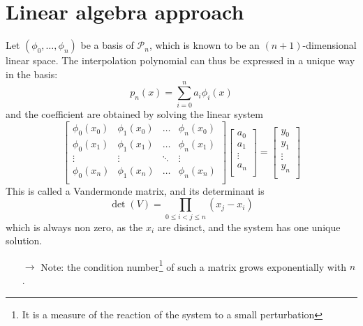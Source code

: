 \documentclass[12pt, openany]{report}
\theoremstyle{definition}
\begin{document}
\section{Linear algebra approach}
Let \((\phi_0,\dots,\phi_n)\) be a basis of \(\mathcal{P}_n\), which is known to be an \((n+1)\)-dimensional linear space. The interpolation polynomial can thus be expressed in a unique way in the basis:
\begin{equation}
    p_n(x) = \sum_{i=0}^n a_i\phi_i(x)
\end{equation}
and the coefficient are obtained by solving the linear system
\begin{equation}
    \begin{bmatrix}
        \phi_0(x_0) & \phi_1(x_0) & \dots & \phi_n(x_0)\\
        \phi_0(x_1) & \phi_1(x_1) & \dots & \phi_n(x_1)\\
        \vdots  & \vdots & \ddots & \vdots\\
        \phi_0(x_n) & \phi_1(x_n) & \dots & \phi_n(x_n)\\
    \end{bmatrix}\begin{bmatrix}
        a_0\\ a_1\\ \vdots \\a_n\\
    \end{bmatrix} = \begin{bmatrix}
        y_0 \\y_1\\\vdots \\ y_n\\
    \end{bmatrix}
\end{equation}
This is called a Vandermonde matrix, and its determinant is 
\begin{equation}
    \det(V) = \prod_{0\le i< j\le n}(x_j-x_i)
\end{equation}
which is always non zero, as the \(x_i\) are disinct, and the system has one unique solution. 
\begin{itemize}
    \item [\(\rightarrow\)] Note: the condition number\footnote{It is a measure of the reaction of the system to a small perturbation} of such a matrix grows exponentially with \(n\). 
\end{itemize}
\end{document}
